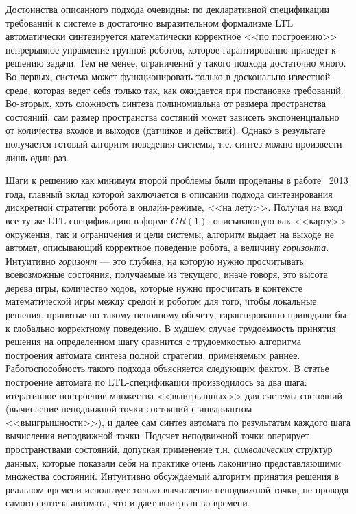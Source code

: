 \documentclass[conference]{IEEEtran}
\begin{document}
Достоинства описанного подхода очевидны: по декларативной спецификации требований 
к системе в достаточно выразительном формализме LTL автоматически синтезируется 
математически корректное <<по построению>> непрерывное управление группой роботов, 
которое гарантированно приведет к решению задачи. Тем не менее, ограничений у 
такого подхода достаточно много. Во-первых, система может функционировать только 
в досконально известной среде, которая ведет себя только так, как ожидается при 
постановке требований. Во-вторых, хоть сложность синтеза полиномиальна от размера 
пространства состояний, сам размер пространства состяний может зависеть экспоненциально
от количества входов и выходов (датчиков и действий). Однако в результате получается 
готовый алгоритм поведения системы, т.е. синтез можно произвести лишь один раз.

Шаги к решению как минимум второй проблемы были проделаны в работе~\cite{livingston2013just} 
2013 года, главный вклад которой заключается в описании подхода синтезирования 
дискретной стратегии робота в онлайн-режиме, <<на лету>>. Получая на вход все 
ту же LTL-спецификацию в форме $GR(1)$, описывающую как <<карту>> окружения, 
так и ограничения и цели системы, алгоритм выдает на выходе не автомат, 
описывающий корректное поведение робота, а величину \textit{горизонта}. Интуитивно 
\textit{горизонт} --- это глубина, на которую нужно просчитывать всевозможные состояния, 
получаемые из текущего, иначе говоря, это высота дерева игры, количество ходов, 
которые нужно просчитать в контексте математической игры между средой и роботом 
для того, чтобы локальные решения, принятые по такому неполному обсчету, 
гарантированно приводили бы к глобально корректному поведению. В худшем случае 
трудоемкость принятия решения на определенном шагу сравнится с трудоемкостью 
алгоритма построения автомата синтеза полной стратегии, применяемым раннее. 
Работоспособность такого подхода объясняется следующим фактом. В статье~\cite{piterman2006synthesis}
построение автомата по LTL-спецификации производилось за два шага: итеративное 
построение множества <<выигрышных>> для системы состояний (вычисление 
неподвижной точки состояний с инвариантом <<выигрышности>>), и далее сам синтез 
автомата по результатам каждого шага вычисления неподвижной точки. Подсчет неподвижной
точки оперирует пространствами состояний, допуская применение т.н. 
\textit{символических} структур данных, которые показали себя на практике 
очень лаконично представляющими множества состояний. Интуитивно обсуждаемый 
алгоритм принятия решения в реальном времени использует только вычисление 
неподвижной точки, не проводя самого синтеза автомата, что и дает выигрыш 
во времени.
\end{document}
